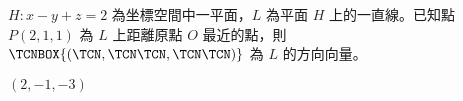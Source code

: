 \begin{QUESTIONS}
\begin{QUESTION}
\begin{ExamAnsRateInfo}{31}{74}{17}{2}
        \end{ExamAnsRateInfo}
        \begin{QBODY}
            $H: x-y+z=2$ 為坐標空間中一平面，$L$ 為平面 $H$ 上的一直線。已知點 $P(2,1,1)$ 為 $L$ 上距離原點 $O$ 最近的點，則 $\TCNBOX{(\TCN,\TCN\TCN,\TCN\TCN)}$ 為 $L$ 的方向向量。
        \end{QBODY}
        \begin{QFROMS}
        \end{QFROMS}
        \begin{QTAGS}\end{QTAGS}
        \begin{QANS}
            $(2,-1,-3)$
        \end{QANS}
        \begin{QSOLLIST}
        \end{QSOLLIST}
        \begin{QEMPTYSPACE}
        \end{QEMPTYSPACE}
    \end{QUESTION}
\end{QUESTIONS}
